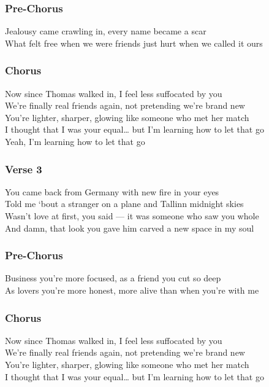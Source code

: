 \subsubsection{Pre-Chorus}\label{pre-chorus-48}

Jealousy came crawling in, every name became a scar\\
What felt free when we were friends just hurt when we called it ours

\subsubsection{Chorus}\label{chorus-67}

Now since Thomas walked in, I feel less suffocated by you\\
We're finally real friends again, not pretending we're brand new\\
You're lighter, sharper, glowing like someone who met her match\\
I thought that I was your equal\ldots{} but I'm learning how to let that
go\\
Yeah, I'm learning how to let that go

\subsubsection{Verse 3}\label{verse-3-15}

You came back from Germany with new fire in your eyes\\
Told me `bout a stranger on a plane and Tallinn midnight skies\\
Wasn't love at first, you said --- it was someone who saw you whole\\
And damn, that look you gave him carved a new space in my soul

\subsubsection{Pre-Chorus}\label{pre-chorus-49}

Business you're more focused, as a friend you cut so deep\\
As lovers you're more honest, more alive than when you're with me

\subsubsection{Chorus}\label{chorus-68}

Now since Thomas walked in, I feel less suffocated by you\\
We're finally real friends again, not pretending we're brand new\\
You're lighter, sharper, glowing like someone who met her match\\
I thought that I was your equal\ldots{} but I'm learning how to let that
go

